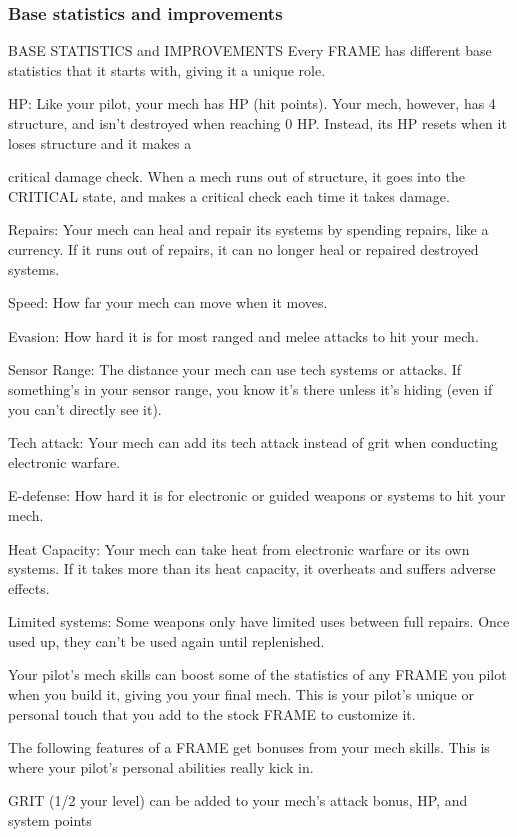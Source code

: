 \subsubsection{Base statistics and improvements}
                         BASE STATISTICS and IMPROVEMENTS
Every FRAME has different base statistics that it starts with, giving it a unique role.


HP: Like your pilot, your mech has HP (hit points). Your mech, however, has 4 structure, and
isn’t destroyed when reaching 0 HP. Instead, its HP resets when it loses structure and it makes a




critical damage check. When a mech runs out of structure, it goes into the CRITICAL state, and
makes a critical check each time it takes damage.

Repairs: Your mech can heal and repair its systems by spending repairs, like a currency. If it runs
out of repairs, it can no longer heal or repaired destroyed systems.

Speed: How far your mech can move when it moves.

Evasion: How hard it is for most ranged and melee attacks to hit your mech.

Sensor Range: The distance your mech can use tech systems or attacks. If something’s in your
sensor range, you know it’s there unless it’s hiding (even if you can’t directly see it).

Tech attack: Your mech can add its tech attack instead of grit when conducting electronic
warfare.

E-defense: How hard it is for electronic or guided weapons or systems to hit your mech.

Heat Capacity: Your mech can take heat from electronic warfare or its own systems. If it takes
more than its heat capacity, it overheats and suffers adverse effects.

Limited systems: Some weapons only have limited uses between full repairs. Once used up,
they can’t be used again until replenished.


Your pilot’s mech skills can boost some of the statistics of any FRAME you pilot when you build
it, giving you your final mech. This is your pilot’s unique or personal touch that you add to the
stock FRAME to customize it.


The following features of a FRAME get bonuses from your mech skills. This is where your pilot’s
personal abilities really kick in.


GRIT (1/2 your level) can be added to your mech’s attack bonus, HP, and system points


